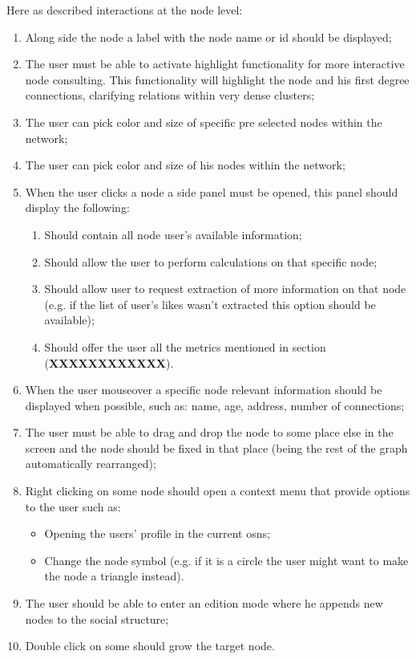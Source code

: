 Here as described interactions at the node level:
\begin{enumerate}
    \item Along side the node a label with the node name or id should be displayed;
    \item The user must be able to activate highlight functionality for more interactive node consulting. This functionality will highlight the node
    and his first degree connections, clarifying relations within very dense clusters;
    \item The user can pick color and size of specific pre selected nodes within the network;
    \item The user can pick color and size of his nodes within the network;
    \item When the user clicks a node a side panel must be opened, this panel should display the following:
    \begin{enumerate}
        \item Should contain all node user's available information;
        \item Should allow the user to perform calculations on that specific node;
        \item Should allow user to request extraction of more information on that node (e.g. if the list of user's likes wasn't extracted this option should be available);
        \item Should offer the user all the metrics mentioned in section (\textbf{XXXXXXXXXXXX}).
    \end{enumerate}
    \item When the user mouseover a specific node relevant information should be displayed when possible, such as: name, age, address, number of connections;
    \item The user must be able to drag and drop the node to some place else in the screen and the node should be fixed in that place (being the rest of the graph
    automatically rearranged);
    \item Right clicking on some node should open a context menu that provide options to the user such as:
    \begin{itemize}
        \item Opening the users' profile in the current \glspl{osn};
        \item Change the node symbol (e.g. if it is a circle the user might want to make the node a triangle instead). %
    \end{itemize}
    \item The user should be able to enter an edition mode where he appends new nodes to the social structure;
    \item Double click on some should grow the target node. %
\end{enumerate}

